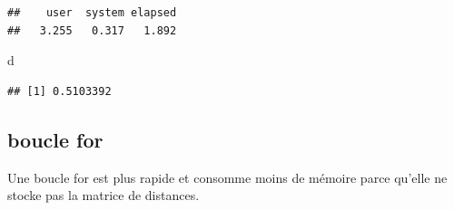 \documentclass[
  11pt,
  french,
  a4paper,
  extrafontsizes,onecolumn,openright
  ]{memoir}
\newenvironment{Shaded}{\begin{snugshade}}{\end{snugshade}}
\newcommand{\ControlFlowTok}[1]{\textcolor[rgb]{0.13,0.29,0.53}{\textbf{#1}}}
\newcommand{\DecValTok}[1]{\textcolor[rgb]{0.00,0.00,0.81}{#1}}
\newcommand{\FunctionTok}[1]{\textcolor[rgb]{0.00,0.00,0.00}{#1}}
\newcommand{\NormalTok}[1]{#1}
\newcommand{\OtherTok}[1]{\textcolor[rgb]{0.56,0.35,0.01}{#1}}
\newcommand{\SpecialCharTok}[1]{\textcolor[rgb]{0.00,0.00,0.00}{#1}}
\begin{document}
\begin{verbatim}
##    user  system elapsed 
##   3.255   0.317   1.892
\end{verbatim}

\begin{Shaded}
\begin{Highlighting}[]
\NormalTok{d}
\end{Highlighting}
\end{Shaded}

\begin{verbatim}
## [1] 0.5103392
\end{verbatim}

\normalsize

\hypertarget{boucle-for}{%
\subsection{boucle for}\label{boucle-for}}

Une boucle for est plus rapide et consomme moins de mémoire parce qu'elle ne stocke pas la matrice de distances.

\scriptsize

\begin{Shaded}
\end{Shaded}
\end{document}
